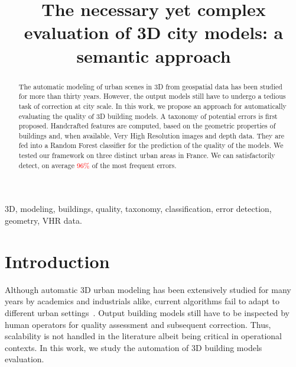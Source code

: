\documentclass[conference]{IEEEtran}
\begin{document}
\title{The necessary yet complex evaluation of 3D city models: a semantic approach
}

\author{
\and
{}
}

\maketitle

\begin{abstract}
	The automatic modeling of urban scenes in 3D from geospatial data has been studied for more than thirty years. However, the output models still have to undergo a tedious task of correction at city scale. In this work, we propose an approach for automatically evaluating the quality of 3D building models. A taxonomy of potential errors is first proposed. Handcrafted features are computed, based on the geometric properties of buildings and, when available, Very High Resolution images and depth data. They are fed into a Random Forest classifier for the prediction of the quality of the models. We tested our framework on three distinct urban areas in France. We can satisfactorily detect, on average \textcolor{red}{96\%} of the most frequent errors.
\end{abstract}
\begin{IEEEkeywords}
  3D, modeling, buildings, quality, taxonomy, classification, error detection, geometry, VHR data.
\end{IEEEkeywords}

\section{Introduction}

	Although automatic 3D urban modeling has been extensively studied for many years by academics and industrials alike, current algorithms fail to adapt to different urban settings~\cite{Musialski2012}. Output building models still have to be inspected by human operators for quality assessment and subsequent correction. Thus, scalability is not handled in the literature albeit being critical in operational contexts. In this work, we study the automation of 3D building models evaluation. 
    
\end{document}
